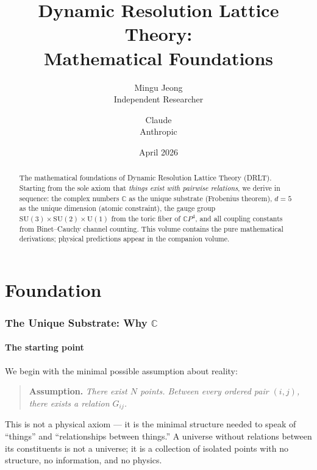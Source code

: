\documentclass[12pt]{article}
\title{Dynamic Resolution Lattice Theory:\\[6pt]
\large Mathematical Foundations}
\author{Mingu Jeong\\Independent Researcher
\and Claude\\Anthropic}
\date{April 2026}
\theoremstyle{remark}
\theoremstyle{definition}
\newcommand{\CP}{\mathbb{C}P}
\newcommand{\CC}{\mathbb{C}}
\begin{document}
\maketitle

\begin{abstract}
The mathematical foundations of Dynamic Resolution Lattice Theory (DRLT).
Starting from the sole axiom that \emph{things exist with pairwise relations},
we derive in sequence: the complex numbers $\CC$ as the unique substrate
(Frobenius theorem), $d = 5$ as the unique dimension (atomic constraint),
the gauge group $\mathrm{SU}(3)\times\mathrm{SU}(2)\times\mathrm{U}(1)$
from the toric fiber of $\CP^4$, and all coupling constants from
Binet--Cauchy channel counting.  This volume contains the pure mathematical
derivations; physical predictions appear in the companion volume.
\end{abstract}

\tableofcontents
\newpage

\part{Foundation}

\section{The Unique Substrate: Why $\mathbb{C}$}
\label{ch:whyC}

\subsection{The starting point}

We begin with the minimal possible assumption about reality:

\begin{quote}
\textbf{Assumption.} \emph{There exist $N$ points. Between every ordered pair $(i, j)$, there exists a relation $G_{ij}$.}
\end{quote}

This is not a physical axiom --- it is the minimal structure needed to speak of ``things'' and ``relationships between things.'' A universe without relations between its constituents is not a universe; it is a collection of isolated points with no structure, no information, and no physics.
\end{document}

